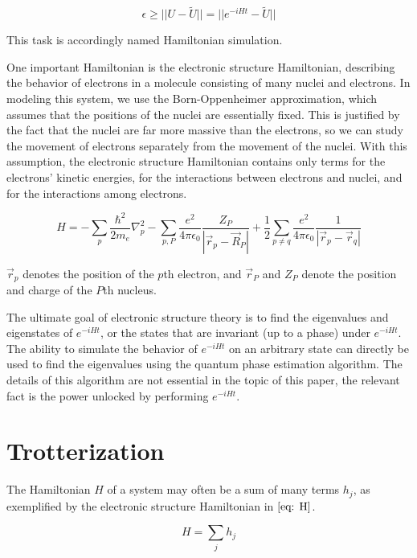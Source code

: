\begin{equation}
    \epsilon \geq ||U - \tilde{U}|| = ||e^{-iHt} - \tilde{U}||
\end{equation}

This task is accordingly named Hamiltonian simulation.

One important Hamiltonian is the electronic structure Hamiltonian, describing the behavior of electrons in a molecule consisting of many nuclei and electrons. In modeling this system, we use the Born-Oppenheimer approximation, which assumes that the positions of the nuclei are essentially fixed. This is justified by the fact that the nuclei are far more massive than the electrons, so we can study the movement of electrons separately from the movement of the nuclei. With this assumption, the electronic structure Hamiltonian contains only terms for the electrons' kinetic energies, for the interactions between electrons and nuclei, and for the interactions among electrons.

\begin{equation}
    H = -\sum_p \frac{\hbar^2}{2m_e} \nabla^2_p - \sum_{p, P}\frac{e^2}{4\pi\epsilon_0}\frac{Z_P}{|\vec{r}_p - \vec{R}_P|} + \frac{1}{2}\sum_{p \neq q}\frac{e^2}{4\pi\epsilon_0}\frac{1}{|\vec{r}_p - \vec{r}_q|} \label{eq: H}
\end{equation}

$\vec{r}_p$ denotes the position of the $p$th electron, and $\vec{r}_P$ and $Z_P$ denote the position and charge of the $P$th nucleus.

The ultimate goal of electronic structure theory is to find the eigenvalues and eigenstates of $e^{-iHt}$, or the states that are invariant (up to a phase) under $e^{-iHt}$. The ability to simulate the behavior of $e^{-iHt}$ on an arbitrary state can directly be used to find the eigenvalues using the quantum phase estimation algorithm. The details of this algorithm are not essential in the topic of this paper, the relevant fact is the power unlocked by performing $e^{-iHt}$.

\section{Trotterization}

The Hamiltonian $H$ of a system may often be a sum of many terms $h_j$, as exemplified by the electronic structure Hamiltonian in $\eqref{eq: H}$.

\begin{equation}
    H = \sum_j h_j
\end{equation}

